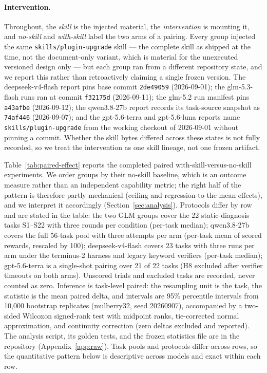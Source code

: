 \documentclass[11pt]{article}
\begin{document}
\paragraph{Intervention.}
Throughout, the \emph{skill} is the injected material, the \emph{intervention} is mounting it, and \emph{no-skill} and \emph{with-skill} label the two arms of a pairing.
Every group injected the same \texttt{skills/plugin-upgrade} skill --- the complete skill as shipped at the time, not the document-only variant, which is material for the unexecuted versioned design only --- but each group ran from a different repository state, and we report this rather than retroactively claiming a single frozen version.
The deepseek-v4-flash report pins base commit \texttt{2de49059} (2026-09-01); the glm-5.3-flash runs ran at commit \texttt{f32175d} (2026-09-11); the glm-5.2 run manifest pins \texttt{a43afbe} (2026-09-12); the qwen3.8-27b report records its task-source snapshot as \texttt{74af446} (2026-09-07); and the gpt-5.6-terra and gpt-5.6-luna reports name \texttt{skills/plugin-upgrade} from the working checkout of 2026-09-01 without pinning a commit.
Whether the skill bytes differed across these states is not fully recorded, so we treat the intervention as one skill lineage, not one frozen artifact.

Table~\ref{tab:paired-effect} reports the completed paired with-skill-versus-no-skill experiments.
We order groups by their no-skill baseline, which is an outcome measure rather than an independent capability metric; the right half of the pattern is therefore partly mechanical (ceiling and regression-to-the-mean effects), and we interpret it accordingly (Section~\ref{sec:analysis}).
Protocols differ by row and are stated in the table: the two GLM groups cover the 22 static-diagnosis tasks S1--S22 with three rounds per condition (per-task median); qwen3.8-27b covers the full 56-task pool with three attempts per arm (per-task mean of scored rewards, rescaled by 100); deepseek-v4-flash covers 23 tasks with three runs per arm under the terminus-2 harness and legacy keyword verifiers (per-task median); gpt-5.6-terra is a single-shot pairing over 21 of 22 tasks (H8 excluded after verifier timeouts on both arms).
Unscored trials and excluded tasks are recorded, never counted as zero.
Inference is task-level paired: the resampling unit is the task, the statistic is the mean paired delta, and intervals are 95\% percentile intervals from 10{,}000 bootstrap replicates (mulberry32, seed 20260907), accompanied by a two-sided Wilcoxon signed-rank test with midpoint ranks, tie-corrected normal approximation, and continuity correction (zero deltas excluded and reported).
The analysis script, its golden tests, and the frozen statistics file are in the repository (Appendix~\ref{app:raw}).
Task pools and protocols differ across rows, so the quantitative pattern below is descriptive across models and exact within each row.
\end{document}
